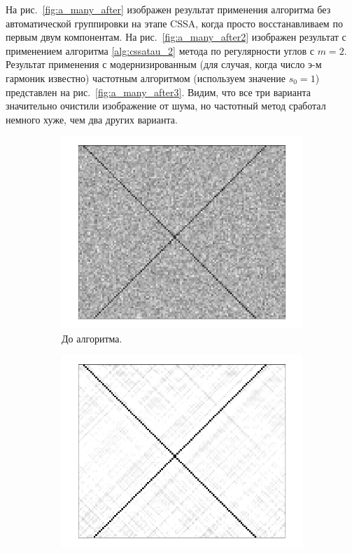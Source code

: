 \documentclass[specialist,
               substylefile = spbu.rtx,
               subf,href,colorlinks=true, 12pt]{disser}
\begin{document}
На рис.~\ref{fig:a_many_after} изображен результат применения алгоритма без автоматической группировки на этапе CSSA, когда просто восстанавливаем по первым двум компонентам. На рис.~\ref{fig:a_many_after2} изображен результат с применением алгоритма \ref{alg:cssatau_2} метода по регулярности углов с $m=2$. 
Результат применения с модернизированным (для случая, когда число э-м гармоник известно) частотным алгоритмом (используем значение $s_0 = 1$) представлен на рис.~\ref{fig:a_many_after3}.
Видим, что все три варианта значительно очистили изображение от шума, но частотный метод сработал немного хуже, чем два других варианта.
\begin{figure}
        \centering
      \begin{subfigure}[b]{0.45\textwidth}
        \includegraphics[width=\textwidth]{lines_noise}
        \caption{До алгоритма.}
        \label{fig:a_many_before}
    \end{subfigure}
        \quad       
  \begin{subfigure}[b]{0.45\textwidth}
      \includegraphics[width=\textwidth]{noauto_lines}

\end{subfigure}
\end{figure}
\end{document}
